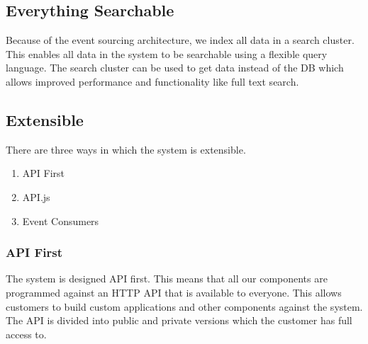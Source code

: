 \documentclass[11pt]{article}
\begin{document}

\subsection{Everything Searchable}

Because of the event sourcing architecture, we index all data in a search cluster.
This enables all data in the system to be searchable using a flexible query language.
The search cluster can be used to get data instead of the DB which allows improved
performance and functionality like full text search.

\subsection{Extensible}

There are three ways in which the system is extensible.
\begin{enumerate}
    \item API First
    \item API.js
    \item Event Consumers
\end{enumerate}

\subsubsection{API First}

The system is designed API first. This means that all our components are programmed 
against an HTTP API that is available to everyone. This allows customers to build custom 
applications and other components against the system. The API is divided into public and 
private versions which the customer has full access to.
\end{document}

